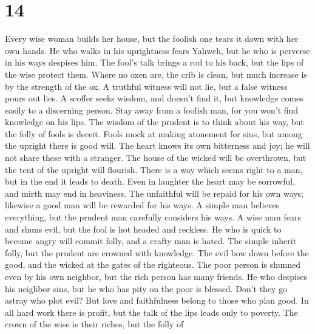 \hypertarget{section-13}{%
\section{14}\label{section-13}}

 Every wise woman builds her house, but the foolish one
tears it down with her own hands.  He who walks in his
uprightness fears Yahweh, but he who is perverse in his ways despises
him.  The fool's talk brings a rod to his back, but the
lips of the wise protect them.  Where no oxen are, the
crib is clean, but much increase is by the strength of the ox.
 A truthful witness will not lie, but a false witness
pours out lies.  A scoffer seeks wisdom, and doesn't find
it, but knowledge comes easily to a discerning person. 
Stay away from a foolish man, for you won't find knowledge on his lips.
 The wisdom of the prudent is to think about his way, but
the folly of fools is deceit.  Fools mock at making
atonement for sins, but among the upright there is good will.
 The heart knows its own bitterness and joy; he will not
share these with a stranger.  The house of the wicked
will be overthrown, but the tent of the upright will flourish.
 There is a way which seems right to a man, but in the
end it leads to death.  Even in laughter the heart may be
sorrowful, and mirth may end in heaviness.  The
unfaithful will be repaid for his own ways; likewise a good man will be
rewarded for his ways.  A simple man believes everything,
but the prudent man carefully considers his ways.  A wise
man fears and shuns evil, but the fool is hot headed and reckless.
 He who is quick to become angry will commit folly, and a
crafty man is hated.  The simple inherit folly, but the
prudent are crowned with knowledge.  The evil bow down
before the good, and the wicked at the gates of the righteous.
 The poor person is shunned even by his own neighbor, but
the rich person has many friends.  He who despises his
neighbor sins, but he who has pity on the poor is blessed.
 Don't they go astray who plot evil? But love and
faithfulness belong to those who plan good.  In all hard
work there is profit, but the talk of the lips leads only to poverty.
 The crown of the wise is their riches, but the folly of
